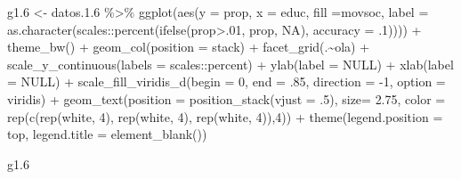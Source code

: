 \documentclass[
  12pt,
]{book}
\newenvironment{Shaded}{\begin{snugshade}}{\end{snugshade}}
\newcommand{\AttributeTok}[1]{\textcolor[rgb]{0.77,0.63,0.00}{#1}}
\newcommand{\ConstantTok}[1]{\textcolor[rgb]{0.00,0.00,0.00}{#1}}
\newcommand{\DecValTok}[1]{\textcolor[rgb]{0.00,0.00,0.81}{#1}}
\newcommand{\FloatTok}[1]{\textcolor[rgb]{0.00,0.00,0.81}{#1}}
\newcommand{\FunctionTok}[1]{\textcolor[rgb]{0.00,0.00,0.00}{#1}}
\newcommand{\NormalTok}[1]{#1}
\newcommand{\OtherTok}[1]{\textcolor[rgb]{0.56,0.35,0.01}{#1}}
\newcommand{\SpecialCharTok}[1]{\textcolor[rgb]{0.00,0.00,0.00}{#1}}
\newcommand{\StringTok}[1]{\textcolor[rgb]{0.31,0.60,0.02}{#1}}
\begin{document}
\begin{Shaded}
\begin{Highlighting}[]
  
\NormalTok{g1}\FloatTok{.6} \OtherTok{\textless{}{-}}\NormalTok{ datos.}\FloatTok{1.6} \SpecialCharTok{\%\textgreater{}\%} 
  \FunctionTok{ggplot}\NormalTok{(}\FunctionTok{aes}\NormalTok{(}\AttributeTok{y =}\NormalTok{ prop, }\AttributeTok{x =}\NormalTok{ educ, }\AttributeTok{fill =}\NormalTok{movsoc, }
             \AttributeTok{label =} \FunctionTok{as.character}\NormalTok{(scales}\SpecialCharTok{::}\FunctionTok{percent}\NormalTok{(}\FunctionTok{ifelse}\NormalTok{(prop}\SpecialCharTok{\textgreater{}}\NormalTok{.}\DecValTok{01}\NormalTok{, prop, }\ConstantTok{NA}\NormalTok{), }\AttributeTok{accuracy =}\NormalTok{ .}\DecValTok{1}\NormalTok{)))) }\SpecialCharTok{+}
  \FunctionTok{theme\_bw}\NormalTok{() }\SpecialCharTok{+}
  \FunctionTok{geom\_col}\NormalTok{(}\AttributeTok{position =} \StringTok{\textquotesingle{}stack\textquotesingle{}}\NormalTok{) }\SpecialCharTok{+}
  \FunctionTok{facet\_grid}\NormalTok{(.}\SpecialCharTok{\textasciitilde{}}\NormalTok{ola) }\SpecialCharTok{+}
  \FunctionTok{scale\_y\_continuous}\NormalTok{(}\AttributeTok{labels =}\NormalTok{ scales}\SpecialCharTok{::}\NormalTok{percent) }\SpecialCharTok{+}
  \FunctionTok{ylab}\NormalTok{(}\AttributeTok{label =} \ConstantTok{NULL}\NormalTok{) }\SpecialCharTok{+}
  \FunctionTok{xlab}\NormalTok{(}\AttributeTok{label =} \ConstantTok{NULL}\NormalTok{) }\SpecialCharTok{+}
  \FunctionTok{scale\_fill\_viridis\_d}\NormalTok{(}\AttributeTok{begin =} \DecValTok{0}\NormalTok{, }\AttributeTok{end =}\NormalTok{ .}\DecValTok{85}\NormalTok{, }\AttributeTok{direction =} \SpecialCharTok{{-}}\DecValTok{1}\NormalTok{, }\AttributeTok{option =} \StringTok{\textquotesingle{}viridis\textquotesingle{}}\NormalTok{) }\SpecialCharTok{+}
  \FunctionTok{geom\_text}\NormalTok{(}\AttributeTok{position =} \FunctionTok{position\_stack}\NormalTok{(}\AttributeTok{vjust =}\NormalTok{ .}\DecValTok{5}\NormalTok{),}
            \AttributeTok{size=} \FloatTok{2.75}\NormalTok{,}
            \AttributeTok{color =} \FunctionTok{rep}\NormalTok{(}\FunctionTok{c}\NormalTok{(}\FunctionTok{rep}\NormalTok{(}\StringTok{\textquotesingle{}white\textquotesingle{}}\NormalTok{, }\DecValTok{4}\NormalTok{),}
                          \FunctionTok{rep}\NormalTok{(}\StringTok{\textquotesingle{}white\textquotesingle{}}\NormalTok{, }\DecValTok{4}\NormalTok{),}
                          \FunctionTok{rep}\NormalTok{(}\StringTok{\textquotesingle{}white\textquotesingle{}}\NormalTok{, }\DecValTok{4}\NormalTok{)),}\DecValTok{4}\NormalTok{)) }\SpecialCharTok{+} 
  \FunctionTok{theme}\NormalTok{(}\AttributeTok{legend.position =} \StringTok{\textquotesingle{}top\textquotesingle{}}\NormalTok{,}
        \AttributeTok{legend.title =} \FunctionTok{element\_blank}\NormalTok{())}

\NormalTok{g1}\FloatTok{.6}
\end{Highlighting}
\end{Shaded}
\end{document}
